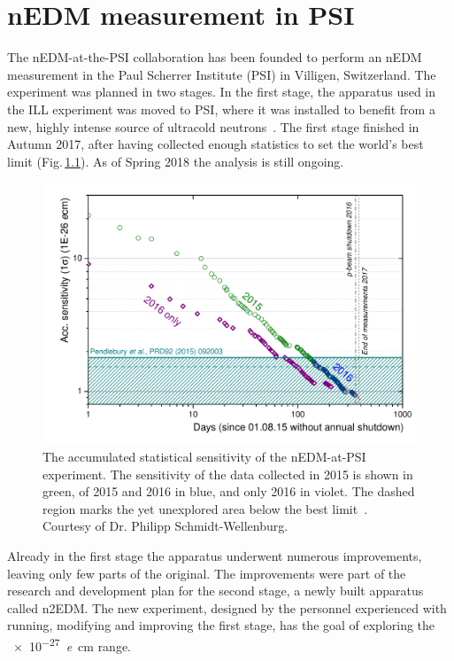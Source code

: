 \chapter{nEDM measurement in PSI}
\label{ch:nedm-at-psi-apparatus}

The nEDM-at-the-PSI collaboration has been founded to perform an nEDM measurement in the Paul Scherrer Institute (PSI) in Villigen, Switzerland. The experiment was planned in two stages. In the first stage, the apparatus used in the ILL experiment was moved to PSI, where it was installed to benefit from a new, highly intense source of ultracold neutrons~\cite{Lauss2014}. The first stage finished in Autumn 2017, after having collected enough statistics to set the world's best limit (Fig.\,\ref{fig:nEDM_accumulated_sensitivity}). As of Spring 2018 the analysis is still ongoing.

\begin{figure}
  \centering
  \includegraphics[width=0.8\linewidth]{gfx/nEDMatPSI/accumulated_sensitivity.pdf}
  \caption{The accumulated statistical sensitivity of the nEDM-at-PSI experiment. The sensitivity of the data collected in 2015 is shown in green, of 2015 and 2016 in blue, and only 2016 in violet. The dashed region marks the yet unexplored area below the best limit~\cite{Pendlebury2015}. Courtesy of Dr. Philipp Schmidt-Wellenburg.}
  \label{fig:nEDM_accumulated_sensitivity}
\end{figure}

Already in the first stage the apparatus underwent numerous improvements, leaving only few parts of the original. The improvements were part of the research and development plan for the second stage, a newly built apparatus called n2EDM. The new experiment, designed by the personnel experienced with running, modifying and improving the first stage, has the goal of exploring the \SI{e-27}{\elementarycharge\centi\meter} range.


